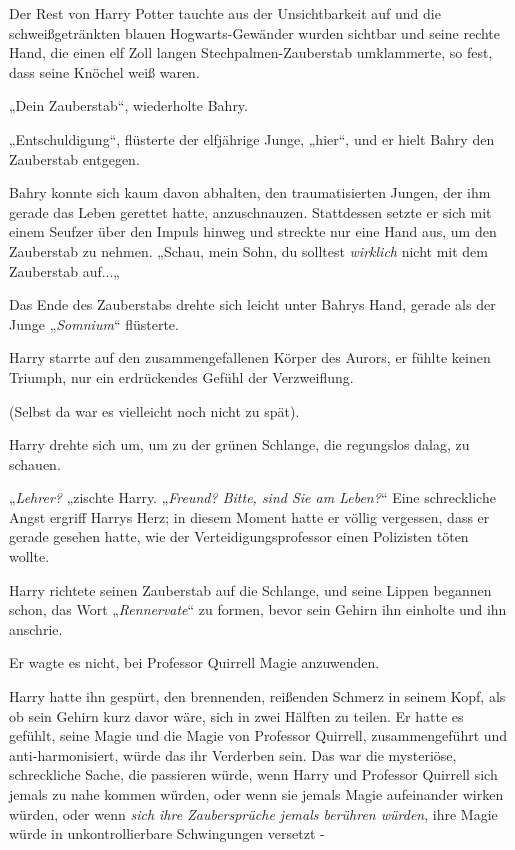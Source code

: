 {Der Rest von Harry Potter tauchte aus der Unsichtbarkeit auf und die schweißgetränkten blauen Hogwarts-Gewänder wurden sichtbar und seine rechte Hand, die einen elf Zoll langen Stechpalmen-Zauberstab umklammerte, so fest, dass seine Knöchel weiß waren.

„Dein Zauberstab“, wiederholte Bahry.

„Entschuldigung“, flüsterte der elfjährige Junge, „hier“, und er hielt Bahry den Zauberstab entgegen.

Bahry konnte sich kaum davon abhalten, den traumatisierten Jungen, der ihm gerade das Leben gerettet hatte, anzuschnauzen. Stattdessen setzte er sich mit einem Seufzer über den Impuls hinweg und streckte nur eine Hand aus, um den Zauberstab zu nehmen. „Schau, mein Sohn, du solltest \emph{wirklich} nicht mit dem Zauberstab auf...„

Das Ende des Zauberstabs drehte sich leicht unter Bahrys Hand, gerade als der Junge „\emph{Somnium}“ flüsterte.

Harry starrte auf den zusammengefallenen Körper des Aurors, er fühlte keinen Triumph, nur ein erdrückendes Gefühl der Verzweiflung.

(Selbst da war es vielleicht noch nicht zu spät).

Harry drehte sich um, um zu der grünen Schlange, die regungslos dalag, zu schauen.

„\emph{Lehrer?} „zischte Harry. „\emph{Freund? Bitte, sind Sie am Leben?}“ Eine schreckliche Angst ergriff Harrys Herz; in diesem Moment hatte er völlig vergessen, dass er gerade gesehen hatte, wie der Verteidigungsprofessor einen Polizisten töten wollte.

Harry richtete seinen Zauberstab auf die Schlange, und seine Lippen begannen schon, das Wort „\emph{Rennervate}“ zu formen, bevor sein Gehirn ihn einholte und ihn anschrie.

Er wagte es nicht, bei Professor Quirrell Magie anzuwenden.

Harry hatte ihn gespürt, den brennenden, reißenden Schmerz in seinem Kopf, als ob sein Gehirn kurz davor wäre, sich in zwei Hälften zu teilen. Er hatte es gefühlt, seine Magie und die Magie von Professor Quirrell, zusammengeführt und anti-harmonisiert, würde das ihr Verderben sein. Das war die mysteriöse, schreckliche Sache, die passieren würde, wenn Harry und Professor Quirrell sich jemals zu nahe kommen würden, oder wenn sie jemals Magie aufeinander wirken würden, oder wenn \emph{sich ihre Zaubersprüche jemals berühren würden}, ihre Magie würde in unkontrollierbare Schwingungen versetzt -

}
